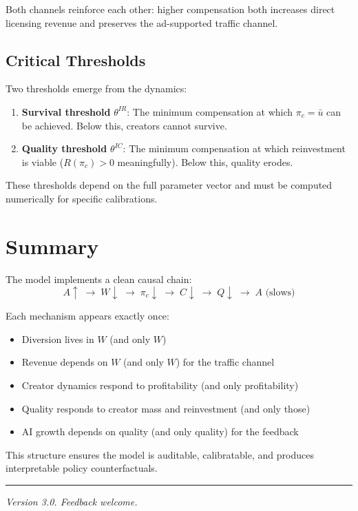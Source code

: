 \documentclass[11pt,a4paper]{article}
\begin{document}
Both channels reinforce each other: higher compensation both increases direct licensing revenue and preserves the ad-supported traffic channel.

\subsection{Critical Thresholds}

Two thresholds emerge from the dynamics:

\begin{enumerate}
    \item \textbf{Survival threshold} $\theta^{IR}$: The minimum compensation at which $\pi_c = \bar{u}$ can be achieved. Below this, creators cannot survive.

    \item \textbf{Quality threshold} $\theta^{IC}$: The minimum compensation at which reinvestment is viable ($R(\pi_c) > 0$ meaningfully). Below this, quality erodes.
\end{enumerate}

These thresholds depend on the full parameter vector and must be computed numerically for specific calibrations.

\section{Summary}

The model implements a clean causal chain:
\[
A \uparrow \;\rightarrow\; W \downarrow \;\rightarrow\; \pi_c \downarrow \;\rightarrow\; C \downarrow \;\rightarrow\; Q \downarrow \;\rightarrow\; A \text{ (slows)}
\]

Each mechanism appears exactly once:
\begin{itemize}
    \item Diversion lives in $W$ (and only $W$)
    \item Revenue depends on $W$ (and only $W$) for the traffic channel
    \item Creator dynamics respond to profitability (and only profitability)
    \item Quality responds to creator mass and reinvestment (and only those)
    \item AI growth depends on quality (and only quality) for the feedback
\end{itemize}

This structure ensures the model is auditable, calibratable, and produces interpretable policy counterfactuals.

\vspace{1em}
\hrule
\vspace{0.5em}
\textit{Version 3.0. Feedback welcome.}
\end{document}
